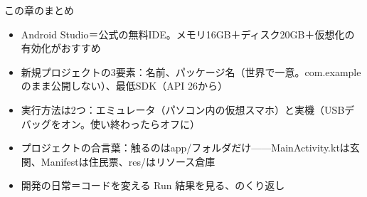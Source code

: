 \begin{tcbsummary}{この章のまとめ}
\begin{itemize}
  \item Android Studio＝公式の無料IDE。メモリ16GB＋ディスク20GB＋仮想化の有効化がおすすめ
  \item 新規プロジェクトの3要素：名前、パッケージ名（世界で一意。com.exampleのまま公開しない）、最低SDK（API 26から）
  \item 実行方法は2つ：エミュレータ（パソコン内の仮想スマホ）と実機（USBデバッグをオン。使い終わったらオフに）
  \item プロジェクトの合言葉：触るのはapp/フォルダだけ——MainActivity.ktは玄関、Manifestは住民票、res/はリソース倉庫
  \item 開発の日常＝コードを変える Run 結果を見る、のくり返し
\end{itemize}

\end{tcbsummary}
